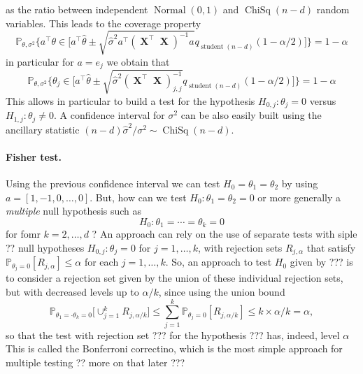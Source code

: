 \documentclass[
	fontsize=11pt, %
	twoside=false, %
	numbers=noenddot, %
]{kaobook}
\DeclareMathOperator{\bX}{\boldsymbol X}
\DeclareMathOperator{\chisq}{ChiSq}
\DeclareMathOperator{\nor}{Normal}
\DeclareMathOperator{\stu}{student}
\renewcommand{\P}{\mathbb P}
\newcommand{\wh}{\widehat}
\begin{document}
as the ratio between independent $\nor(0, 1)$ and $\chisq(n - d)$ random variables.
This leads to the coverage property
\begin{equation*}
	\P_{\theta, \sigma^2} \bigg\{ a^\top \theta \in  \Big[  a^\top \wh \theta \pm \sqrt{\wh \sigma^2 a^\top (\bX^\top \bX)^{-1} a} q_{\stu(n-d)}(1 - \alpha/2) \Big] \bigg\} = 1 - \alpha
\end{equation*}
in particular for $a = e_j$ we obtain that
\begin{equation*}
	\P_{\theta, \sigma^2} \bigg\{ \theta_j \in  \Big[  a^\top \wh \theta \pm \sqrt{\wh \sigma^2 (\bX^\top \bX)_{j, j}^{-1}} q_{\stu(n-d)}(1 - \alpha/2) \Big] \bigg\} = 1 - \alpha
\end{equation*}
This allows in particular to build a test for the hypothesis $H_{0, j} : \theta_j = 0$ versus $H_{1, j} : \theta_j \neq 0$.
A confidence interval for $\sigma^2$ can be also easily built using the ancillary statistic $(n - d) \wh \sigma^2 / \sigma^2 \sim \chisq(n - d)$.

\paragraph{Fisher test.} %

Using the previous confidence interval we can test $H_0 = \theta_1 = \theta_2$ by using $a = [1, -1, 0, \ldots, 0]$. But, how can we test $H_0 : \theta_1 = \theta_2 = 0$ or more generally a \emph{multiple} null hypothesis such as
\begin{equation*}
	H_0 : \theta_1 = \cdots = \theta_k = 0
\end{equation*}
for fomr $k = 2, \ldots, d$ ?
An approach can rely on the use of separate tests with siple ?? null hypotheses $H_{0, j} : \theta_j = 0$ for $j=1, \ldots, k$, with rejection sets $R_{j, \alpha}$ that satisfy $\P_{\theta_j = 0}[R_{j, \alpha}] \leq \alpha$ for each $j=1, \ldots, k$.
So, an approach to test $H_0$ given by ??? is to consider a rejection set given by the union of these individual rejection sets, but with decreased levels up to $\alpha / k$, since using the union bound
\begin{equation*}
	\P_{\theta_1 = \cdot \theta_k = 0} \Big [  \cup_{j=1}^k R_{j, \alpha / k} \Big] 
	\leq \sum_{j=1}^k \P_{\theta_j = 0} [ R_{j, \alpha / k} ] \leq k \times \alpha / k = \alpha,
\end{equation*}
so that the test with rejection set ??? for the hypothesis ??? has, indeed, level $\alpha$
This is called the Bonferroni correctino, which is the most simple approach for multiple testing ?? more on that later ??? 
\end{document}
